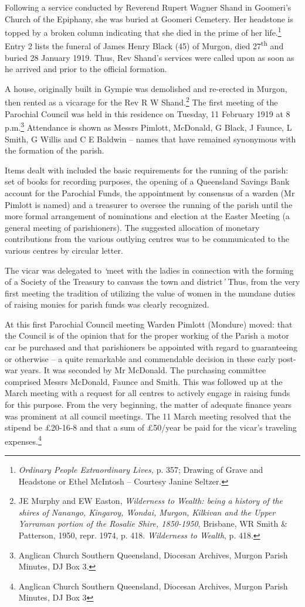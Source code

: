 Following a service conducted by Reverend Rupert Wagner Shand in Goomeri's Church of the Epiphany, she was buried at Goomeri Cemetery. Her headstone is topped by a broken column indicating that she died in the prime of her life.\footnote{\emph{Ordinary People Extraordinary Lives,} p. 357; Drawing of Grave and Headstone or Ethel McIntosh -- Courtesy Janine Seltzer.} Entry 2 lists the funeral of James Henry Black (45) of Murgon, died 27\textsuperscript{th} and buried 28 January 1919. Thus, Rev Shand's services were called upon as soon as he arrived and prior to the official formation.

A house, originally built in Gympie was demolished and re-erected in Murgon, then rented as a vicarage for the Rev R W Shand.\footnote{JE Murphy and EW Easton, \emph{Wilderness to Wealth: being a history of the shires of Nanango, Kingaroy, Wondai, Murgon, Kilkivan and the Upper Yarraman portion of the Rosalie Shire, 1850-1950}, Brisbane, WR Smith \& Patterson, 1950, repr. 1974, p. 418. \emph{Wilderness to Wealth}, p. 418.} The first meeting of the Parochial Council was held in this residence on Tuesday, 11 February 1919 at 8 p.m.\footnote{Anglican Church Southern Queensland, Diocesan Archives, Murgon Parish Minutes, DJ Box 3.} Attendance is shown as Messrs Pimlott, McDonald, G Black, J Faunce, L Smith, G Willis and C E Baldwin -- names that have remained synonymous with the formation of the parish.

Items dealt with included the basic requirements for the running of the parish: set of books for recording purposes, the opening of a Queensland Savings Bank account for the Parochial Funds, the appointment by consensus of a warden (Mr Pimlott is named) and a treasurer to oversee the running of the parish until the more formal arrangement of nominations and election at the Easter Meeting (a general meeting of parishioners). The suggested allocation of monetary contributions from the various outlying centres was to be communicated to the various centres by circular letter.

The vicar was delegated to \emph{`}meet with the ladies in connection with the forming of a Society of the Treasury to canvass the town and district\emph{'} Thus, from the very first meeting the tradition of utilizing the value of women in the mundane duties of raising monies for parish funds was clearly recognized.

At this first Parochial Council meeting Warden Pimlott (Mondure) moved: that the Council is of the opinion that for the proper working of the Parish a motor car be purchased and that parishioners be appointed with regard to guaranteeing or otherwise -- a quite remarkable and commendable decision in these early post-war years. It was seconded by Mr McDonald. The purchasing committee comprised Messrs McDonald, Faunce and Smith. This was followed up at the March meeting with a request for all centres to actively engage in raising funds for this purpose. From the very beginning, the matter of adequate finance years was prominent at all council meetings. The 11 March meeting resolved that the stipend be £20-16-8 and that a sum of £50/year be paid for the vicar's traveling expenses.\footnote{Anglican Church Southern Queensland, Diocesan Archives, Murgon Parish Minutes, DJ Box 3}

